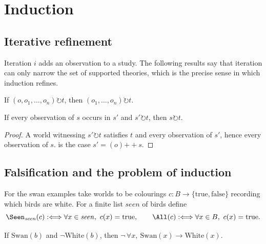 \section{Induction}\label{sec:induction}

\subsection{Iterative refinement}

Iteration $i$ adds an observation to a study. The following results say that iteration can only
narrow the set of supported theories, which is the precise sense in which induction refines.

\begin{proposition}\label{prop:cons}
If $(o,o_1,\dots,o_n)\circlearrowright t$, then $(o_1,\dots,o_n)\circlearrowright t$.
\end{proposition}

\begin{theorem}\label{thm:mono}
If every observation of $s$ occurs in $s'$ and $s'\circlearrowright t$, then $s\circlearrowright t$.
\end{theorem}

\begin{proof}
A world witnessing $s'\circlearrowright t$ satisfies $t$ and every observation of $s'$, hence every
observation of $s$.  is the case $s'=(o)\mathbin{+\!\!+}s$.
\end{proof}

\subsection{Falsification and the problem of induction}

For the swan examples take worlds to be colourings $c:B\to\{\mathrm{true},\mathrm{false}\}$
recording which birds are white. For a finite list $\mathit{seen}$ of birds define
\[
  \Seen_{\mathit{seen}}(c) :\Longleftrightarrow \forall x\in\mathit{seen},\ c(x)=\mathrm{true},
  \qquad
  \All(c) :\Longleftrightarrow \forall x\in B,\ c(x)=\mathrm{true}.
\]

\begin{proposition}[Falsification]\label{prop:popper}
If $\mathrm{Swan}(b)$ and $\neg\mathrm{White}(b)$, then
$\neg\,\forall x,\ \mathrm{Swan}(x)\to\mathrm{White}(x)$.
\end{proposition}

